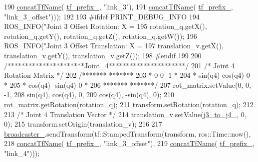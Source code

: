 \begin{DoxyCode}
{{{{{{{{190                                                     \hyperlink{namespacejaco_a6320c11725be13d2957c4e3f474d62f8}{concatTfName}(
      \hyperlink{classjaco_1_1JacoKinematics_a0efb1f0ad1937553c7e285b27da0bdd3}{tf\_prefix\_}, \textcolor{stringliteral}{"link\_3"}),
191                                                     \hyperlink{namespacejaco_a6320c11725be13d2957c4e3f474d62f8}{concatTfName}(
      \hyperlink{classjaco_1_1JacoKinematics_a0efb1f0ad1937553c7e285b27da0bdd3}{tf\_prefix\_}, \textcolor{stringliteral}{"link\_3\_offset"})));
192 
193 \textcolor{preprocessor}{#ifdef PRINT\_DEBUG\_INFO}
194     ROS\_INFO(\textcolor{stringliteral}{"Joint 3 Offset Rotation: X = %
195              rotation\_q.getX(), rotation\_q.getY(), rotation\_q.getZ(), rotation\_q.getW());
196     ROS\_INFO(\textcolor{stringliteral}{"Joint 3 Offset Translation: X = %
197              translation\_v.getX(), translation\_v.getY(), translation\_v.getZ());
198 \textcolor{preprocessor}{#endif}
199 
200     \textcolor{comment}{/**********************Joint\_4**********************/}
201     \textcolor{comment}{/* Joint 4 Rotation Matrix */}
202     \textcolor{comment}{/*******                 *******}
203 \textcolor{comment}{     *    0          0          -1 *}
204 \textcolor{comment}{     * sin(q4)     cos(q4)       0 *}
205 \textcolor{comment}{     * cos(q4)    -sin(q4)       0 *}
206 \textcolor{comment}{     *******                *******/}
207     rot\_matrix.setValue(0, 0, -1,
208                         sin(q4), cos(q4), 0,
209                         cos(q4), -sin(q4), 0);
210     rot\_matrix.getRotation(rotation\_q);
211     transform.setRotation(rotation\_q);
212 
213     \textcolor{comment}{/* Joint 4 Translation Vector */}
214     translation\_v.setValue(\hyperlink{classjaco_1_1JacoKinematics_a873308257c7953e6e98b3229766ee8a4}{j3\_to\_j4\_}, 0, 0);
215     transform.setOrigin(translation\_v);
216 
217     \hyperlink{classjaco_1_1JacoKinematics_a3314f9e6a8fb86405384dd23bd194e46}{broadcaster\_}.sendTransform(tf::StampedTransform(transform, ros::Time::now(),
218                                                     \hyperlink{namespacejaco_a6320c11725be13d2957c4e3f474d62f8}{concatTfName}(
      \hyperlink{classjaco_1_1JacoKinematics_a0efb1f0ad1937553c7e285b27da0bdd3}{tf\_prefix\_}, \textcolor{stringliteral}{"link\_3\_offset"}),
219                                                     \hyperlink{namespacejaco_a6320c11725be13d2957c4e3f474d62f8}{concatTfName}(
      \hyperlink{classjaco_1_1JacoKinematics_a0efb1f0ad1937553c7e285b27da0bdd3}{tf\_prefix\_}, \textcolor{stringliteral}{"link\_4"})));
}}}}}}}}}}
\end{DoxyCode}
